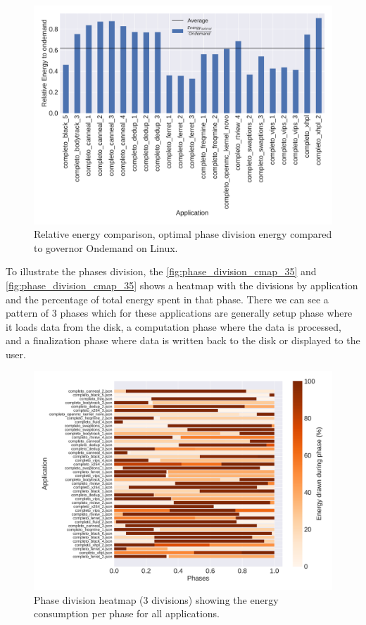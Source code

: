 \begin{figure}[H]
	\centering
	\includegraphics[width=\columnwidth]{phases/figures/comparison_ondemand.pdf}
	\caption{Relative energy comparison, optimal phase division energy compared to governor Ondemand on Linux.}
	\label{fig:cmp_ondemand}
\end{figure}

To illustrate the phases division, the \cref{fig:phase_division_cmap_35} and \cref{fig:phase_division_cmap_35} shows a heatmap with the divisions by application and the percentage of total energy spent in that phase. There we can see a pattern of 3 phases which for these applications are generally setup phase where it loads data from the disk, a computation phase where the data is processed, and a finalization phase where data is written back to the disk or displayed to the user.

\begin{figure}[H]
	\includegraphics[width=\columnwidth]{phases/figures/phase_division_cmap_3.pdf}
	\caption{Phase division heatmap (3 divisions) showing the energy consumption per phase for all applications.}
	\label{fig:phase_division_cmap_3}
\end{figure}

